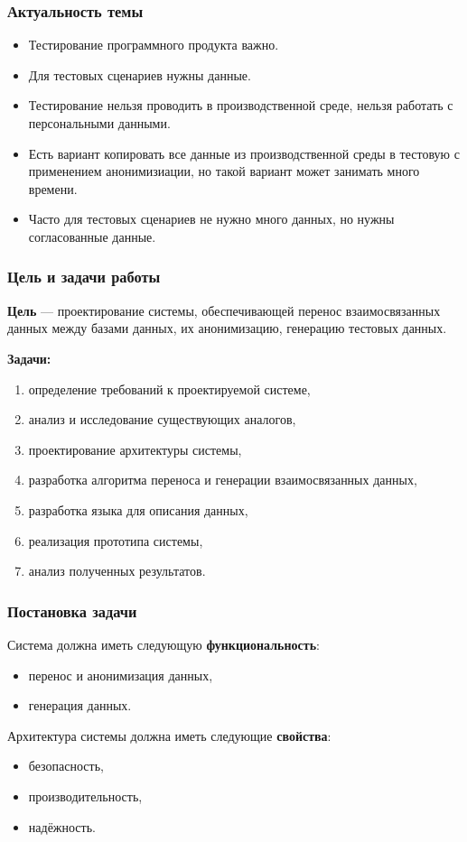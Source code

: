 \documentclass[pdf, hyperref={unicode}, aspectratio=169]{beamer}
\begin{document}

{
	\frame{\titlepage}
}

\begin{frame}
	\frametitle{Актуальность темы}
	\begin{itemize}
		\item Тестирование программного продукта важно.
		\item Для тестовых сценариев нужны данные.
		\item Тестирование нельзя проводить в производственной среде, нельзя работать с персональными данными.
		\item Есть вариант копировать все данные из производственной среды в тестовую с применением анонимизиации, но такой вариант может занимать много времени.
		\item Часто для тестовых сценариев не нужно много данных, но нужны согласованные данные.
	\end{itemize}
\end{frame}


\begin{frame}
	\frametitle{Цель и задачи работы}
	
	\textbf{Цель} --- проектирование системы, обеспечивающей перенос взаимосвязанных данных между базами данных, их анонимизацию, генерацию тестовых данных.

	\textbf{Задачи:}
	\begin{enumerate}
		\item определение требований к проектируемой системе,
		\item анализ и исследование существующих аналогов,
		\item проектирование архитектуры системы,
		\item разработка алгоритма переноса и генерации взаимосвязанных данных,
		\item разработка языка для описания данных,
		\item реализация прототипа системы,
		\item анализ полученных результатов.
	\end{enumerate}
\end{frame}


\begin{frame}
	\frametitle{Постановка задачи}
	
	Система должна иметь следующую \textbf{функциональность}:

	\begin{itemize}
		\item перенос и анонимизация данных,
		\item генерация данных.
	\end{itemize}

	Архитектура системы должна иметь следующие \textbf{свойства}:
	
	\begin{itemize}
		\item безопасность,
		\item производительность,
		\item надёжность.
	\end{itemize}
\end{frame}
\end{document}

